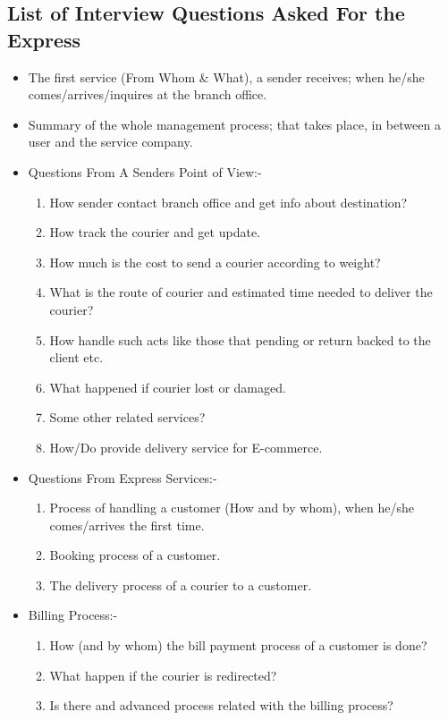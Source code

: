 \begin{appendices}
\subsection{List of Interview Questions Asked For the Express}
\begin{itemize}
	\item The first service (From Whom \& What), a sender receives; when he/she comes/arrives/inquires at the branch office.
	\item Summary of the whole management process; that takes place, in between a user and the service company.
	\item Questions From A Senders Point of View:-
	\begin{enumerate}
		\item How sender contact branch office and get info about destination?
		\item How track the courier and get update.
		\item How much is the cost to send a courier according to weight?
		\item What is the route of courier and estimated time needed to deliver the courier?
		\item How handle such acts like those that pending or return backed to the client etc.
		\item What happened if courier lost or damaged.
		\item Some other related services?
		\item How/Do provide delivery service for E-commerce.
	\end{enumerate}
	\item Questions From Express Services:-
	\begin{enumerate}
		\item Process of handling a customer (How and by whom), when he/she comes/arrives the first time.
		\item Booking process of a customer.
		\item The delivery process of a courier to a customer.
	\end{enumerate}
	\item Billing Process:-
	\begin{enumerate}
		\item How (and by whom) the bill payment process of a customer is done?
		\item What happen if the courier is redirected?
		\item Is there and advanced process related with the billing process?
	\end{enumerate}
\end{itemize}


\end{appendices}
